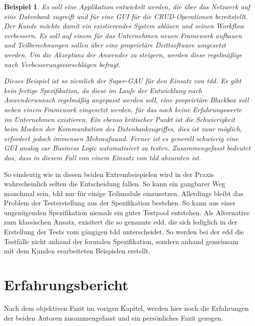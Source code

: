 \documentclass[a4paper,10pt]{scrartcl}
\newtheorem{beispiel}{Beispiel}[section]
\begin{document}
\begin{beispiel}
  \textit{Es soll eine Applikation entwickelt werden, die über das Netzwerk auf eine
  Datenbank zugreift und für eine GUI für die CRUD-Operationen bereitstellt. Der
  Kunde möchte damit ein existierendes System ablösen und seinen Workflow verbessern. Es
  soll auf einem für das Unternehmen neuen Framework aufbauen und Teilberechnungen sollen
  über eine proprietäre Drittsoftware umgesetzt werden. Um die Akzeptanz der Anwender zu
  steigern, werden diese regelmäßige nach Verbesserungsvorschlägen befragt.}
  
  Dieses Beispiel ist so ziemlich der Super-GAU für den Einsatz von \gls{tdd}. Es gibt
  kein fertige Spezifikation, da diese im Laufe der Entwicklung nach Anwenderwunsch
  regelmäßig angepasst werden soll, eine proprietäre Blackbox soll neben einem Framework
  eingesetzt werden, für das noch keine Erfahrungswerte im Unternehmen existieren. Ein
  ebenso kritischer Punkt ist die Schwierigkeit beim Mocken der Kommunkation des 
  Datenbankzugriffes, dies ist zwar möglich, erfordert jedoch immensen Mehraufwand.
  Ferner ist es generell schwierig eine GUI analog zur Business Logic automatisiert zu
  testen. Zusammengefasst bedeutet das, dass in diesem Fall von einem Einsatz von \gls{tdd}
  abzuraten ist.
\end{beispiel}

So eindeutig wie in diesen beiden Extrembeispielen wird in der Praxis wahrscheinlich selten 
die Entscheidung fallen. So kann ein gangbarer Weg manchmal sein, \gls{tdd} nur für einige
Teilmodule einzusetzen. Allerdings bleibt das Problem der Testerstellung aus der Spezifikation
bestehen. So kann aus einer ungenügenden Spezifikation niemals ein guter Testpool entstehen. Als
Alternative zum klassischen Ansatz, exisitert die so genannte \gls{edd},
die sich lediglich in der Erstellung der Tests vom gängigen \gls{tdd} unterscheidet. So werden
bei der \gls{edd} die Testfälle nicht anhand der formalen Spezifikation, sondern
anhand gemeinsam mit dem Kunden erarbeiteten Beispielen erstellt.

\section{Erfahrungsbericht}\label{Erfahrungsbericht}
Nach dem objektiven Fazit im vorigen Kapitel, werden hier noch die Erfahrungen
der beiden Autoren zusammengefasst und ein persönliches Fazit gezogen.
\end{document}

